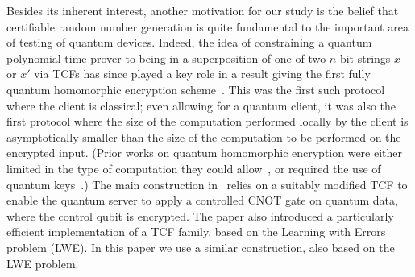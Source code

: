 \documentclass[11pt]{article}
\theoremstyle{remark}
\theoremstyle{definition}
\begin{document}
Besides its inherent interest, another motivation for our study is the belief that  certifiable random number generation  is quite fundamental to the important area 
of testing of quantum devices. Indeed, the idea of constraining a quantum polynomial-time prover to being in a superposition of one of two $n$-bit strings $x$ or $x'$ via TCFs has since played a key role in a result giving the first fully quantum homomorphic encryption scheme~\cite{mahadev2017classical}. This was the first such protocol where the client is classical; even allowing for a quantum client, it was also the first protocol where the size of the computation performed locally by the client is asymptotically smaller than the size of the computation to be performed on the encrypted input. (Prior works on quantum homomorphic encryption were either limited in the type of computation they could allow~\cite{broadbent2015quantum}, or required the use of quantum keys~\cite{dulek2016quantum}.) The main construction in~\cite{mahadev2017classical} relies on a
suitably modified TCF to enable the quantum server to apply a controlled CNOT gate on quantum data, where the control qubit is encrypted. The paper also 
introduced a particularly efficient implementation of a TCF family, based on the Learning with Errors problem (LWE). In this paper we use a similar construction, also based on the LWE problem. 
 
\end{document}
